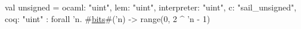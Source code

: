 val unsigned = {
  ocaml: "uint",
  lem: "uint",
  interpreter: "uint",
  c: "sail_unsigned",
  coq: "uint"
} : forall 'n. #\hyperref[zbits]{bits}#('n) -> range(0, 2 ^ 'n - 1)
